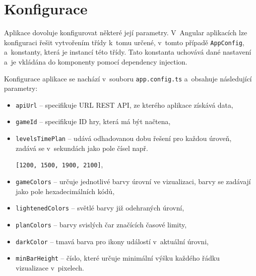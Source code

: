 \documentclass[
  digital, %
  oneside, %
  table,   %
  nolof,     %
  nolot,     %
]{fithesis3}
\begin{document}
\section{Konfigurace} \label{config}
Aplikace dovoluje konfigurovat některé její parametry. V~Angular aplikacích lze konfiguraci řešit vytvořením třídy k~tomu určené, v~tomto případě \verb|AppConfig|, a~konstanty, která je instancí této třídy. Tato konstanta uchovává dané nastavení a~je vkládána do komponenty pomocí dependency injection.\par
Konfigurace aplikace se nachází v~souboru \verb|app.config.ts| a~obsahuje následující parametry:
\begin{itemize}
  \item \verb|apiUrl| – specifikuje URL REST API, ze kterého aplikace získává data,
  \item \verb|gameId| – specifikuje ID hry, která má být načtena,
  \item \verb|levelsTimePlan| – udává odhadovanou dobu řešení pro každou úroveň, zadává se v~sekundách jako pole čísel např.\par
  			\verb|[1200, 1500, 1900, 2100]|,
  \item \verb|gameColors| – určuje jednotlivé barvy úrovní ve vizualizaci, barvy se zadávají jako pole hexadecimálních kódů,
  \item \verb|lightenedColors| – světlé barvy již odehraných úrovní,
  \item \verb|planColors| – barvy svislých čar značících časové limity,
  \item \verb|darkColor| – tmavá barva pro ikony událostí v~aktuální úrovni,
  \item \verb|minBarHeight| – číslo, které určuje minimální výšku každého řádku vizualizace v~pixelech.

\end{itemize}
\end{document}
